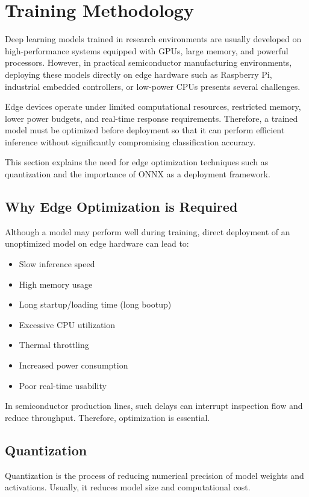 \section{Training Methodology}
Deep learning models trained in research environments are usually developed on high-performance systems equipped with GPUs, large memory, and powerful processors. However, in practical semiconductor manufacturing environments, deploying these models directly on edge hardware such as Raspberry Pi, industrial embedded controllers, or low-power CPUs presents several challenges.

Edge devices operate under limited computational resources, restricted memory, lower power budgets, and real-time response requirements. Therefore, a trained model must be optimized before deployment so that it can perform efficient inference without significantly compromising classification accuracy.

This section explains the need for edge optimization techniques such as quantization and the importance of ONNX as a deployment framework.

\subsection{Why Edge Optimization is Required}
Although a model may perform well during training, direct deployment of an unoptimized model on edge hardware can lead to:
\begin{itemize}
    \item Slow inference speed
    \item High memory usage
    \item Long startup/loading time (long bootup)
    \item Excessive CPU utilization
    \item Thermal throttling
    \item Increased power consumption
    \item Poor real-time usability
\end{itemize}
In semiconductor production lines, such delays can interrupt inspection flow and reduce throughput. Therefore, optimization is essential.

\subsection{Quantization}
Quantization is the process of reducing numerical precision of model weights and activations. Usually, it reduces model size and computational cost.

